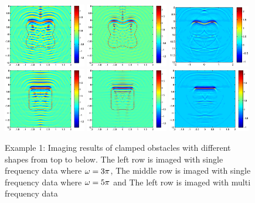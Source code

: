 \documentclass[12pt]{iopart}
\begin{document}
\begin{figure}
	\includegraphics[width=0.32\textwidth]{./graphic/p_leaf_3pi.eps}
	\includegraphics[width=0.32\textwidth]{./graphic/p_leaf_5pi.eps}
	\includegraphics[width=0.32\textwidth]{./graphic/p_leaf.eps}
	\includegraphics[width=0.32\textwidth]{./graphic/rectangle_3pi.eps}
	\includegraphics[width=0.32\textwidth]{./graphic/rectangle_5pi.eps}
	\includegraphics[width=0.32\textwidth]{./graphic/rectangle.eps}
	
	\caption{Example 1: Imaging results of clamped obstacles
		with different shapes from top to below. The left row is imaged with single frequency data where $\omega=3\pi$, The middle row is imaged with single frequency data where $\omega=5\pi$ and The left row is imaged with multi frequency data}\label{figure_1}
\end{figure}
\end{document}
